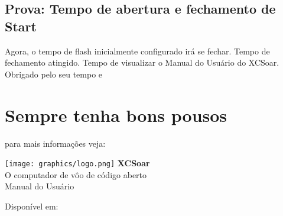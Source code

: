 \documentclass[a4paper,12pt]{refrep}
\begin{document}
\subsection*{\textcolor{flashblue}{Prova: Tempo de abertura e fechamento de Start}}
Agora, o tempo de flash inicialmente configurado irá se fechar.  Tempo de fechamento atingido.  Tempo de visualizar o Manual do Usuário do XCSoar. 
Obrigado pelo seu tempo e


\section*{Sempre tenha bons pousos}%



\newpage
\pagestyle{empty}

\normalsize{para mais informações veja:\\}
\vspace{0.5em}

\begin{center}
    \texttt{[image: graphics/logo.png]}
    \vskip 0.5cm
    \fontsize{50}{0}
    \selectfont\textbf{XCSoar}\\
    \fontsize{12}{12}
    \vspace{0.2em}
    \LARGE{O computador de vôo de código aberto}\\
    \vspace{1.2em}
    \LARGE{Manual do Usuário}\\
    
\vspace{9em}

\end{center}
\begin{flushright}
\normalsize Disponível em: \\
\end{flushright}
\end{document}
